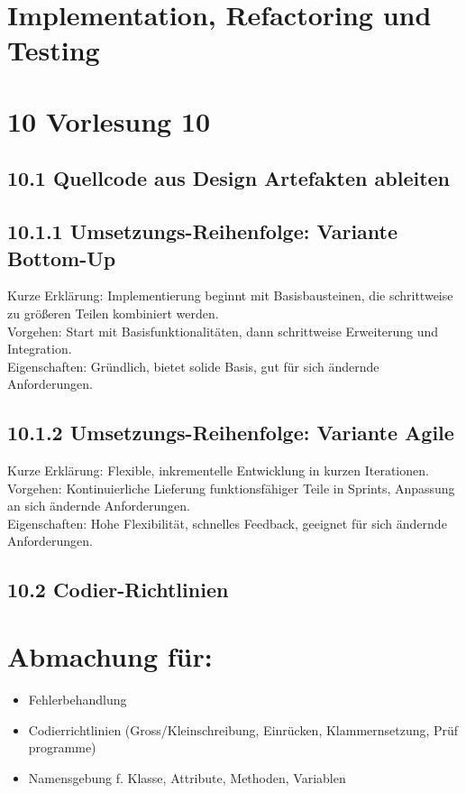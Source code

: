 \section{Implementation, Refactoring und Testing}

\section*{10 Vorlesung 10}
\subsection*{10.1 Quellcode aus Design Artefakten ableiten}
\subsection*{10.1.1 Umsetzungs-Reihenfolge: Variante Bottom-Up}
Kurze Erklärung: Implementierung beginnt mit Basisbausteinen, die schrittweise zu größeren Teilen kombiniert werden.\\
Vorgehen: Start mit Basisfunktionalitäten, dann schrittweise Erweiterung und Integration.\\
Eigenschaften: Gründlich, bietet solide Basis, gut für sich ändernde Anforderungen.

\subsection*{10.1.2 Umsetzungs-Reihenfolge: Variante Agile}
Kurze Erklärung: Flexible, inkrementelle Entwicklung in kurzen Iterationen. Vorgehen: Kontinuierliche Lieferung funktionsfähiger Teile in Sprints, Anpassung an sich ändernde Anforderungen.\\
Eigenschaften: Hohe Flexibilität, schnelles Feedback, geeignet für sich ändernde Anforderungen.

\subsection*{10.2 Codier-Richtlinien}
\section*{Abmachung für:}
\begin{itemize}
  \item Fehlerbehandlung
  \item Codierrichtlinien (Gross/Kleinschreibung, Einrücken, Klammernsetzung, Prüf programme)
  \item Namensgebung f. Klasse, Attribute, Methoden, Variablen
\end{itemize}

